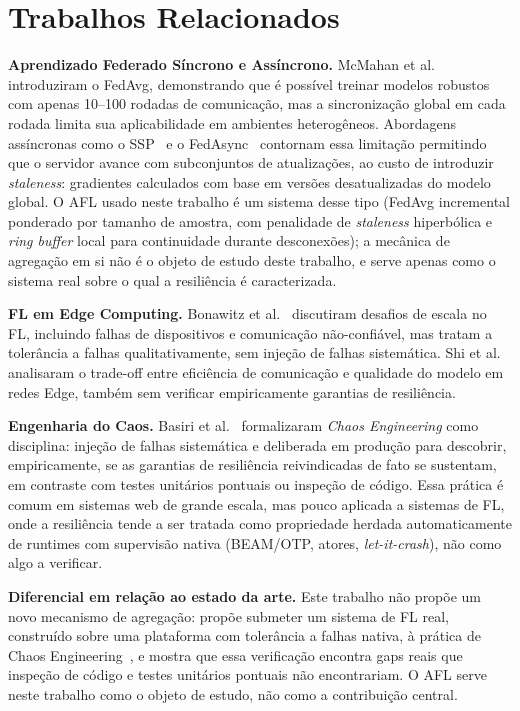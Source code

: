 \documentclass[conference,a4paper]{IEEEtran}
\begin{document}
\section{Trabalhos Relacionados}
\label{sec:related}

\textbf{Aprendizado Federado Síncrono e Assíncrono.}
McMahan et al.~\cite{mcmahan2017} introduziram o FedAvg, demonstrando que
é possível treinar modelos robustos com apenas 10--100 rodadas de
comunicação, mas a sincronização global em cada rodada limita sua
aplicabilidade em ambientes heterogêneos. Abordagens assíncronas como o
SSP~\cite{ho2013} e o FedAsync~\cite{xie2019} contornam essa limitação
permitindo que o servidor avance com subconjuntos de atualizações, ao
custo de introduzir \textit{staleness}: gradientes calculados com base
em versões desatualizadas do modelo global. O AFL usado neste trabalho é
um sistema desse tipo (FedAvg incremental ponderado por tamanho de
amostra, com penalidade de \textit{staleness} hiperbólica e
\textit{ring buffer} local para continuidade durante desconexões); a
mecânica de agregação em si não é o objeto de estudo deste trabalho, e
serve apenas como o sistema real sobre o qual a resiliência é
caracterizada.

\textbf{FL em Edge Computing.}
Bonawitz et al.~\cite{bonawitz2019} discutiram desafios de escala no FL,
incluindo falhas de dispositivos e comunicação não-confiável, mas tratam
a tolerância a falhas qualitativamente, sem injeção de falhas sistemática.
Shi et al.~\cite{shi2020} analisaram o trade-off entre eficiência de
comunicação e qualidade do modelo em redes Edge, também sem verificar
empiricamente garantias de resiliência.

\textbf{Engenharia do Caos.}
Basiri et al.~\cite{basiri2016} formalizaram \textit{Chaos Engineering}
como disciplina: injeção de falhas sistemática e deliberada em produção
para descobrir, empiricamente, se as garantias de resiliência reivindicadas
de fato se sustentam, em contraste com testes unitários pontuais ou
inspeção de código. Essa prática é comum em sistemas web de grande escala,
mas pouco aplicada a sistemas de FL, onde a resiliência tende a ser tratada
como propriedade herdada automaticamente de runtimes com supervisão nativa
(BEAM/OTP, atores, \textit{let-it-crash}), não como algo a verificar.

\textbf{Diferencial em relação ao estado da arte.}
Este trabalho não propõe um novo mecanismo de agregação: propõe submeter
um sistema de FL real, construído sobre uma plataforma com tolerância a
falhas nativa, à prática de Chaos Engineering~\cite{basiri2016}, e
mostra que essa verificação encontra gaps reais que inspeção de código e
testes unitários pontuais não encontrariam. O AFL serve neste trabalho
como o objeto de estudo, não como a contribuição central.
\end{document}
